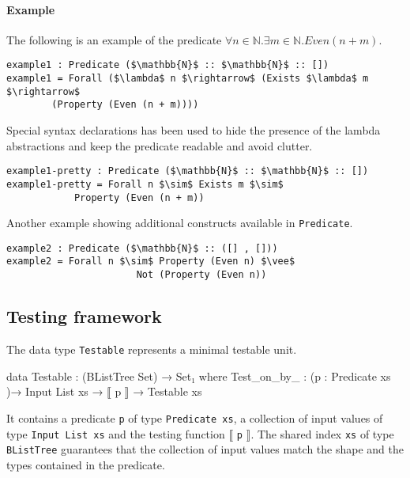 \documentclass[10pt,a4paper]{article}
\begin{document}
\paragraph{Example}
The following is an example of the predicate $\forall n \in \mathbb{N} . \exists m \in \mathbb{N} . Even (n + m)$.
\begin{lstlisting}
example1 : Predicate ($\mathbb{N}$ :: $\mathbb{N}$ :: [])
example1 = Forall ($\lambda$ n $\rightarrow$ (Exists $\lambda$ m $\rightarrow$
		(Property (Even (n + m))))
\end{lstlisting}
Special syntax declarations has been used to hide the presence of the lambda abstractions and keep the predicate readable and avoid clutter.
\begin{lstlisting}
example1-pretty : Predicate ($\mathbb{N}$ :: $\mathbb{N}$ :: [])
example1-pretty = Forall n $\sim$ Exists m $\sim$ 
			Property (Even (n + m))
\end{lstlisting}
Another example showing additional constructs available in \texttt{Predicate}.
\begin{lstlisting}
example2 : Predicate ($\mathbb{N}$ :: ([] , []))
example2 = Forall n $\sim$ Property (Even n) $\vee$ 
                       Not (Property (Even n))
\end{lstlisting}

\subsection{Testing framework}
\label{sec:testing}
The data type \texttt{Testable} represents a minimal testable unit.

\begin{code}
data Testable : (BListTree Set) → Set₁ where
  Test_on_by_ : (p : Predicate xs )→ Input List xs →  ⟦ p ⟧ → Testable xs
\end{code}

It contains a predicate \texttt{p} of type \texttt{Predicate xs}, a collection of input values of type \texttt{Input List xs} and the testing function $\llbracket$ \texttt{p} $ \rrbracket$. The shared index \texttt{xs} of type \texttt{BListTree} guarantees that the collection of input values match the shape and the types contained in the predicate.
\end{document}
